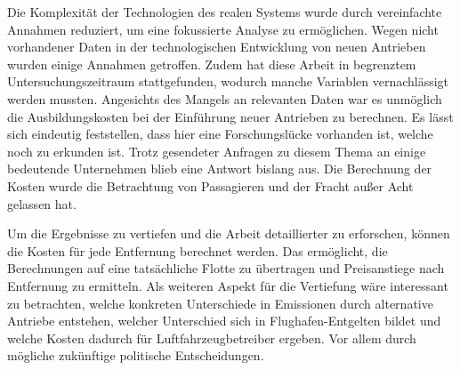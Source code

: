 Die Komplexität der Technologien des realen Systems wurde durch vereinfachte Annahmen reduziert, 
um eine fokussierte Analyse zu ermöglichen. 
Wegen nicht vorhandener Daten in der technologischen Entwicklung von neuen Antrieben wurden einige Annahmen getroffen.
Zudem hat diese Arbeit in begrenztem Untersuchungszeitraum stattgefunden, 
wodurch manche Variablen vernachlässigt werden mussten.
%
Angesichts des Mangels an relevanten Daten war es unmöglich die Ausbildungskosten bei der Einführung neuer Antrieben zu berechnen.
Es lässt sich eindeutig feststellen, dass hier eine Forschungslücke vorhanden ist, welche noch zu erkunden ist.
Trotz gesendeter Anfragen zu diesem Thema an einige bedeutende Unternehmen blieb eine Antwort bislang aus.
%
Die Berechnung der Kosten wurde die Betrachtung von Passagieren und der Fracht außer Acht gelassen hat. 

Um die Ergebnisse zu vertiefen und die Arbeit detaillierter zu erforschen, können die Kosten für jede Entfernung berechnet werden.
Das ermöglicht, die Berechnungen auf eine tatsächliche Flotte zu übertragen und Preisanstiege nach Entfernung zu ermitteln.
Als weiteren Aspekt für die Vertiefung wäre interessant zu betrachten, welche konkreten Unterschiede in Emissionen durch 
alternative Antriebe entstehen, welcher Unterschied sich in Flughafen-Entgelten bildet und welche Kosten dadurch
für Luftfahrzeugbetreiber ergeben. Vor allem durch mögliche zukünftige politische Entscheidungen.


